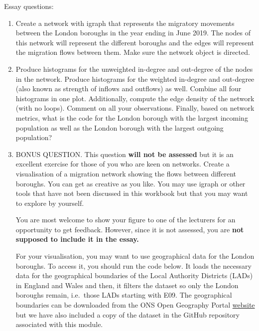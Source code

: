 \documentclass[
  letterpaper,
  DIV=11,
  numbers=noendperiod]{scrreprt}
\begin{document}
Essay questions:

\begin{enumerate}
\def\labelenumi{\arabic{enumi}.}
\item
  Create a network with igraph that represents the migratory movements
  between the London boroughs in the year ending in June 2019. The nodes
  of this network will represent the different boroughs and the edges
  will represent the migration flows between them. Make sure the network
  object is directed.
\item
  Produce histograms for the unweighted in-degree and out-degree of the
  nodes in the network. Produce histograms for the weighted in-degree
  and out-degree (also known as strength of inflows and outflows) as
  well. Combine all four histograms in one plot. Additionally, compute
  the edge density of the network (with no loops). Comment on all your
  observations. Finally, based on network metrics, what is the code for
  the London borough with the largest incoming population as well as the
  London borough with the largest outgoing population?
\item
  BONUS QUESTION. This question \textbf{will not be assessed} but it is
  an excellent exercise for those of you who are keen on networks.
  Create a visualisation of a migration network showing the flows
  between different boroughs. You can get as creative as you like. You
  may use igraph or other tools that have not been discussed in this
  workbook but that you may want to explore by yourself.

  You are most welcome to show your figure to one of the lecturers for
  an opportunity to get feedback. However, since it is not assessed, you
  are \textbf{not supposed to include it in the essay.}

  For your visualisation, you may want to use geographical data for the
  London boroughs. To access it, you should run the code below. It loads
  the necessary data for the geographical boundaries of the Local
  Authority Districts (LADs) in England and Wales and then, it filters
  the dataset so only the London boroughs remain, i.e.~those LADs
  starting with E09. The geographical boundaries can be downloaded from
  the ONS Open Geography Portal
  \href{https://geoportal.statistics.gov.uk/search?collection=Dataset\&sort=name\&tags=all(BDY_LAD\%2CDEC_2022)}{website}
  but we have also included a copy of the dataset in the GitHub
  repository associated with this module.
\end{enumerate}
\end{document}
